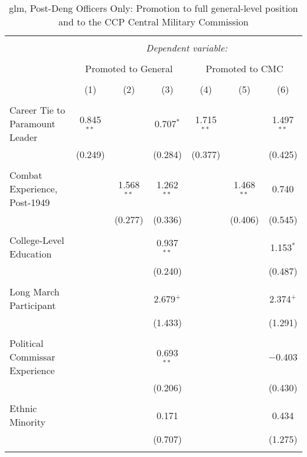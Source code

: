 \documentclass[12pt,letterpaper]{article}
\begin{document}
\begin{table}[!htbp] \centering 
	\caption{glm, Post-Deng Officers Only: Promotion to full general-level position and to the CCP Central Military Commission} 
	\label{table_a11}
	\rmfamily
    \scriptsize 
	\begin{tabular}{@{\extracolsep{5pt}}lcccccc} 
		\\[-1.8ex]\hline 
		\hline \\[-1.8ex] 
		& \multicolumn{6}{c}{\textit{Dependent variable:}} \\ 
		\cline{2-7} 
		\\[-1.8ex] & \multicolumn{3}{c}{Promoted to General} & \multicolumn{3}{c}{Promoted to CMC} \\ 
		\\[-1.8ex] & (1) & (2) & (3) & (4) & (5) & (6)\\ 
		\hline \\[-1.8ex] 
		Career Tie to Paramount Leader & 0.845$^{**}$ &  & 0.707$^{*}$ & 1.715$^{**}$ &  & 1.497$^{**}$ \\ 
		& (0.249) &  & (0.284) & (0.377) &  & (0.425) \\ 
		& & & & & & \\ 
		Combat Experience, Post-1949 &  & 1.568$^{**}$ & 1.262$^{**}$ &  & 1.468$^{**}$ & 0.740 \\ 
		&  & (0.277) & (0.336) &  & (0.406) & (0.545) \\ 
		& & & & & & \\ 
		College-Level Education &  &  & 0.937$^{**}$ &  &  & 1.153$^{*}$ \\ 
		&  &  & (0.240) &  &  & (0.487) \\ 
		& & & & & & \\ 
		Long March Participant &  &  & 2.679$^{+}$ &  &  & 2.374$^{+}$ \\ 
		&  &  & (1.433) &  &  & (1.291) \\ 
		& & & & & & \\ 
		Political Commissar Experience &  &  & 0.693$^{**}$ &  &  & $-$0.403 \\ 
		&  &  & (0.206) &  &  & (0.430) \\ 
		& & & & & & \\ 
		Ethnic Minority &  &  & 0.171 &  &  & 0.434 \\ 
		&  &  & (0.707) &  &  & (1.275) \\ 
		& & & & & & \\ 

\end{tabular}
\end{table}
\end{document}
